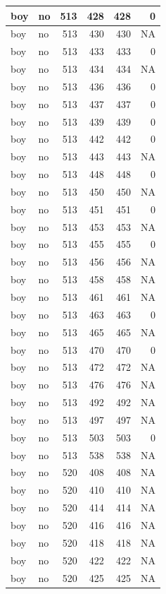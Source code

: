 \documentclass[man]{apa6}
\begin{document}
\begin{tabular}{l|l|r|r|r|r}
\hline
boy & no & 513 & 428 & 428 & 0\\
\hline
boy & no & 513 & 430 & 430 & NA\\
\hline
boy & no & 513 & 433 & 433 & 0\\
\hline
boy & no & 513 & 434 & 434 & NA\\
\hline
boy & no & 513 & 436 & 436 & 0\\
\hline
boy & no & 513 & 437 & 437 & 0\\
\hline
boy & no & 513 & 439 & 439 & 0\\
\hline
boy & no & 513 & 442 & 442 & 0\\
\hline
boy & no & 513 & 443 & 443 & NA\\
\hline
boy & no & 513 & 448 & 448 & 0\\
\hline
boy & no & 513 & 450 & 450 & NA\\
\hline
boy & no & 513 & 451 & 451 & 0\\
\hline
boy & no & 513 & 453 & 453 & NA\\
\hline
boy & no & 513 & 455 & 455 & 0\\
\hline
boy & no & 513 & 456 & 456 & NA\\
\hline
boy & no & 513 & 458 & 458 & NA\\
\hline
boy & no & 513 & 461 & 461 & NA\\
\hline
boy & no & 513 & 463 & 463 & 0\\
\hline
boy & no & 513 & 465 & 465 & NA\\
\hline
boy & no & 513 & 470 & 470 & 0\\
\hline
boy & no & 513 & 472 & 472 & NA\\
\hline
boy & no & 513 & 476 & 476 & NA\\
\hline
boy & no & 513 & 492 & 492 & NA\\
\hline
boy & no & 513 & 497 & 497 & NA\\
\hline
boy & no & 513 & 503 & 503 & 0\\
\hline
boy & no & 513 & 538 & 538 & NA\\
\hline
boy & no & 520 & 408 & 408 & NA\\
\hline
boy & no & 520 & 410 & 410 & NA\\
\hline
boy & no & 520 & 414 & 414 & NA\\
\hline
boy & no & 520 & 416 & 416 & NA\\
\hline
boy & no & 520 & 418 & 418 & NA\\
\hline
boy & no & 520 & 422 & 422 & NA\\
\hline
boy & no & 520 & 425 & 425 & NA\\

\end{tabular}
\end{document}
